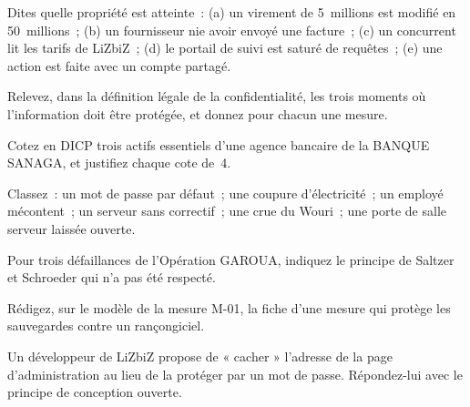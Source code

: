 \begin{boxexo}[title={\ding{45}\quad Exercice~1.2. Quelle propriété~? \niveaubase}]
Dites quelle propriété est atteinte~: (a) un virement de 5~millions est
modifié en 50~millions~; (b) un fournisseur nie avoir envoyé une facture~;
(c) un concurrent lit les tarifs de LiZbiZ~; (d) le portail de suivi est
saturé de requêtes~; (e) une action est faite avec un compte partagé.
\end{boxexo}

\begin{boxexo}[title={\ding{45}\quad Exercice~1.3. Le texte de la loi \niveaubase}]
Relevez, dans la définition légale de la confidentialité, les trois
moments où l'information doit être protégée, et donnez pour chacun une
mesure.
\end{boxexo}

\begin{boxexo}[title={\ding{45}\quad Exercice~1.4. Coter \niveaumoyen}]
Cotez en DICP trois actifs essentiels d'une agence bancaire de la BANQUE
SANAGA, et justifiez chaque cote de~4.
\end{boxexo}

\begin{boxexo}[title={\ding{45}\quad Exercice~1.5. Menace ou vulnérabilité~? \niveaumoyen}]
Classez~: un mot de passe par défaut~; une coupure d'électricité~; un
employé mécontent~; un serveur sans correctif~; une crue du Wouri~; une
porte de salle serveur laissée ouverte.
\end{boxexo}

\begin{boxexo}[title={\ding{45}\quad Exercice~1.6. Les principes à Garoua \niveaumoyen}]
Pour trois défaillances de l'Opération GAROUA, indiquez le principe de
Saltzer et Schroeder qui n'a pas été respecté.
\end{boxexo}

\begin{boxexo}[title={\ding{45}\quad Exercice~1.7. Une mesure \niveaumoyen}]
Rédigez, sur le modèle de la mesure M-01, la fiche d'une mesure qui
protège les sauvegardes contre un rançongiciel.
\end{boxexo}

\begin{boxexo}[title={\ding{45}\quad Exercice~1.8. Conception ouverte \niveaumoyen}]
Un développeur de LiZbiZ propose de « cacher » l'adresse de la page
d'administration au lieu de la protéger par un mot de passe. Répondez-lui
avec le principe de conception ouverte.
\end{boxexo}

